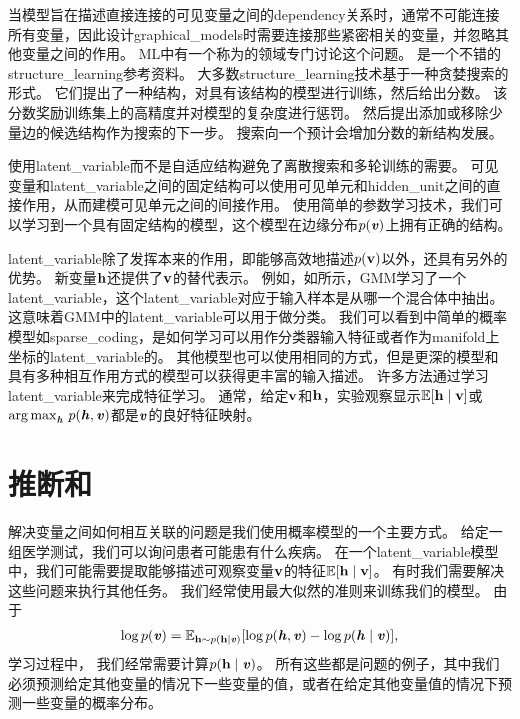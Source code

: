 当模型旨在描述直接连接的可见变量之间的\gls{dependency}关系时，通常不可能连接所有变量，因此设计\gls{graphical_models}时需要连接那些紧密相关的变量，并忽略其他变量之间的作用。
\gls{ML}中有一个称为的领域专门讨论这个问题。
\citet{koller-book2009}是一个不错的\gls{structure_learning}参考资料。
大多数\gls{structure_learning}技术基于一种贪婪搜索的形式。
它们提出了一种结构，对具有该结构的模型进行训练，然后给出分数。 
该分数奖励训练集上的高精度并对模型的复杂度进行惩罚。
然后提出添加或移除少量边的候选结构作为搜索的下一步。
搜索向一个预计会增加分数的新结构发展。 %


使用\gls{latent_variable}而不是自适应结构避免了离散搜索和多轮训练的需要。 
可见变量和\gls{latent_variable}之间的固定结构可以使用可见单元和\gls{hidden_unit}之间的直接作用，从而建模可见单元之间的间接作用。
使用简单的参数学习技术，我们可以学习到一个具有固定结构的模型，这个模型在边缘分布$p(\boldsymbol{\mathit{v}})$上拥有正确的结构。


\gls{latent_variable}除了发挥本来的作用，即能够高效地描述$p(\mathbf{v})$以外，还具有另外的优势。%
新变量$\mathbf{h}$还提供了$\mathbf{v}$的替代表示。
例如，如所示，\gls{GMM}学习了一个\gls{latent_variable}，这个\gls{latent_variable}对应于输入样本是从哪一个混合体中抽出。
这意味着\gls{GMM}中的\gls{latent_variable}可以用于做分类。
我们可以看到中简单的概率模型如\gls{sparse_coding}，是如何学习可以用作分类器输入特征或者作为\gls{manifold}上坐标的\gls{latent_variable}的。
其他模型也可以使用相同的方式，但是更深的模型和具有多种相互作用方式的模型可以获得更丰富的输入描述。
许多方法通过学习\gls{latent_variable}来完成特征学习。
通常，给定$\mathbf{v}$和$\mathbf{h}$，实验观察显示$\mathbb{E}[\mathbf{h}\mid\mathbf{v}]$或${\arg\max}_{\boldsymbol{\mathit{h}}}\ p(\boldsymbol{\mathit{h}},\boldsymbol{\mathit{v}})$都是$\boldsymbol{\mathit{v}}$的良好特征映射。

\section{推断和}
\label{sec:inference_and_approximate_inference}


解决变量之间如何相互关联的问题是我们使用概率模型的一个主要方式。 
给定一组医学测试，我们可以询问患者可能患有什么疾病。
在一个\gls{latent_variable}模型中，我们可能需要提取能够描述可观察变量$\mathbf{v}$的特征$\mathbb{E}[\mathbf{h} \mid \mathbf{v}]$。
有时我们需要解决这些问题来执行其他任务。 
我们经常使用最大似然的准则来训练我们的模型。
由于
\begin{align}
\label{eqn:169}
\log p(\boldsymbol{\mathit{v}}) = \mathbb{E}_{\mathbf{h} \sim p(\mathbf{h}\mid \boldsymbol{\mathit{v}})} [\log p(\boldsymbol{\mathit{h}},\boldsymbol{\mathit{v}}) -  \log p(\boldsymbol{\mathit{h}}\mid\boldsymbol{\mathit{v}})],
\end{align}
学习过程中，%
我们经常需要计算$p(\mathbf{h}\mid\boldsymbol{\mathit{v}})$。
所有这些都是问题的例子，其中我们必须预测给定其他变量的情况下一些变量的值，或者在给定其他变量值的情况下预测一些变量的概率分布。

